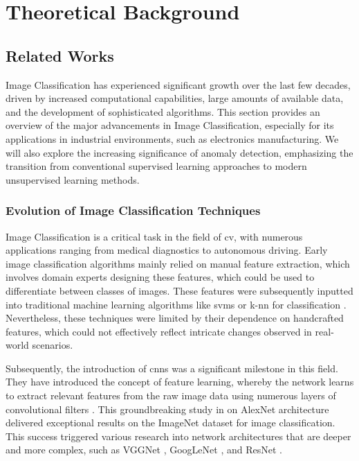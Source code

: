 \chapter{Theoretical Background}

\section{Related Works}

Image Classification has experienced significant growth over the last few decades, driven by increased computational capabilities, large amounts of available data, and the development of sophisticated algorithms. This section provides an overview of the major advancements in Image Classification, especially for its applications in industrial environments, such as electronics manufacturing. We will also explore the increasing significance of anomaly detection, emphasizing the transition from conventional supervised learning approaches to modern unsupervised learning methods.

\subsection{Evolution of Image Classification Techniques}

Image Classification is a critical task in the field of \gls{cv}, with numerous applications ranging from medical diagnostics to autonomous driving. Early image classification algorithms mainly relied on manual feature extraction, which involves domain experts designing these features, which could be used to differentiate between classes of images. These features were subsequently inputted into traditional machine learning algorithms like \glspl{svm} or \gls{k-nn} for classification \cite{LeCun2015}. Nevertheless, these techniques were limited by their dependence on handcrafted features, which could not effectively reflect intricate changes observed in real-world scenarios.

Subsequently, the introduction of \glspl{cnn} was a significant milestone in this field. They have introduced the concept of feature learning, whereby the network learns to extract relevant features from the raw image data using numerous layers of convolutional filters \cite{NIPS2012_c399862d}. This groundbreaking study in \cite{NIPS2012_c399862d} on AlexNet architecture delivered exceptional results on the ImageNet dataset for image classification. This success triggered various research into network architectures that are deeper and more complex, such as VGGNet \cite{simonyan2015deepconvolutionalnetworkslargescale}, GoogLeNet \cite{7298594}, and ResNet \cite{he2016deep}.

